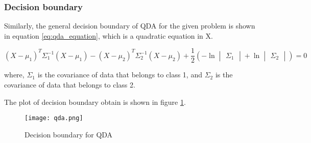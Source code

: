 \documentclass{article}
\begin{document}
\subsubsection{Decision boundary}
Similarly, the general decision boundary of QDA for the given problem is shown in equation \ref{eq:qda_equation}, which is a quadratic equation in X.

\begin{equation}
    \label{eq:qda_equation}
    (X-\mu_{1})^{T}\Sigma^{-1}_{1}(X - \mu_{1}) - (X-\mu_{2})^{T}\Sigma^{-1}_{2}(X - \mu_{2})
    + \frac{1}{2}(-\ln{\begin{vmatrix}\Sigma_{1}\end{vmatrix}} + \ln{\begin{vmatrix}\Sigma_{2}\end{vmatrix}})= 0
\end{equation}

where, $\Sigma_{1}$ is the covariance of data that belongs to class 1, and $\Sigma_{2}$ is the covariance of data that belongs to class 2.

The plot of decision boundary obtain is shown in figure \ref{fig:qda_decision_boundary}.

\begin{figure}[!ht]
  \texttt{[image: qda.png]}
  \caption{Decision boundary for QDA}
  \label{fig:qda_decision_boundary}
\end{figure}
\end{document}
